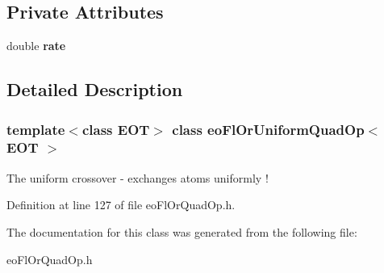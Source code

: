 \subsection*{Private Attributes}
\begin{CompactItemize}
\item 
double {\bf rate}\label{classeo_fl_or_uniform_quad_op_r0}

\end{CompactItemize}


\subsection{Detailed Description}
\subsubsection*{template$<$class EOT$>$ class eo\-Fl\-Or\-Uniform\-Quad\-Op$<$ EOT $>$}

The uniform crossover - exchanges atoms uniformly ! 



Definition at line 127 of file eo\-Fl\-Or\-Quad\-Op.h.

The documentation for this class was generated from the following file:\begin{CompactItemize}
\item 
eo\-Fl\-Or\-Quad\-Op.h\end{CompactItemize}
